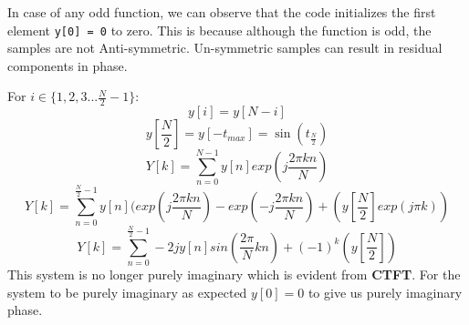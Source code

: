 \documentclass[12pt, a4paper]{report}
\begin{document}
In case of any odd function, we can observe that the code initializes the first element \texttt{y[0] = 0} to zero. This is because although the function is odd, the samples are not Anti-symmetric. Un-symmetric samples can result in residual components in phase.
\clearpage

For $i \in \{ 1,2,3... \frac{N}{2}-1 \}$:
\begin{equation*}
y[i] = y[N-i]
\end{equation*}
\begin{equation*}
y[\frac{N}{2}] = y[-t_{max}] = \sin (t_{\frac{N}{2}})
\end{equation*}
\begin{equation*}
Y[k] = \sum^{N-1}_{n = 0}y[n]exp(j \frac{2 \pi k n}{N})
\end{equation*}
\begin{equation*}
Y[k] = \sum^{\frac{N}{2}-1}_{n = 0}y[n](exp(j \frac{2 \pi k n}{N}) - exp(-j \frac{2 \pi k n}{N}) + (y[\frac{N}{2}]exp(j \pi k))
\end{equation*}
\begin{equation*}
Y[k] = \sum^{\frac{N}{2}-1}_{n = 0}-2jy[n]sin(\frac{2 \pi}{N}kn) + (-1)^k(y[\frac{N}{2}])
\end{equation*}
This system is no longer purely imaginary which is evident from \textbf{CTFT}. For the system to be purely imaginary as expected $y[0] = 0$ to give us purely imaginary phase. 
\end{document}
